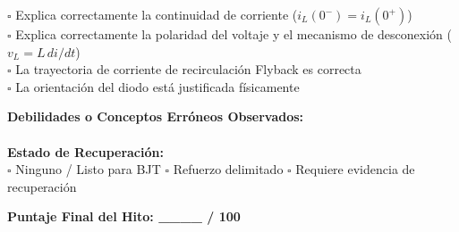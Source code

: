 \documentclass[11pt, a4paper]{article}
\begin{document}
\begin{tcolorbox}[colback=red!5, colframe=red!75!black, title=\textbf{5. Diagnóstico Obligatorio: Transitorios y Flyback}]
$\square$ Explica correctamente la continuidad de corriente ($i_L(0^-) = i_L(0^+)$)\\
$\square$ Explica correctamente la polaridad del voltaje y el mecanismo de desconexión ($v_L = L\,di/dt$)\\
$\square$ La trayectoria de corriente de recirculación Flyback es correcta\\
$\square$ La orientación del diodo está justificada físicamente
\end{tcolorbox}

\begin{tcolorbox}[colback=white, colframe=black, title=\textbf{6. Diagnóstico Final}]
\textbf{Debilidades o Conceptos Erróneos Observados:} \hrulefill \\[0.2cm]
\hrulefill \\[0.2cm]
\textbf{Estado de Recuperación:}\\
$\square$ Ninguno / Listo para BJT \hspace{0.2cm} $\square$ Refuerzo delimitado \hspace{0.2cm} $\square$ Requiere evidencia de recuperación
\end{tcolorbox}

\begin{center}
    \Large \textbf{Puntaje Final del Hito: \_\_\_\_ / 100}
\end{center}
\end{document}
